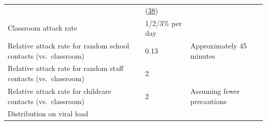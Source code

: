 \documentclass[
]{article}
\begin{document}
\begin{longtable}[]{@{}lll@{}}
\begin{minipage}[t]{0.09\columnwidth}
\end{minipage} & \begin{minipage}[t]{0.54\columnwidth}\raggedright
(\protect\hyperlink{ref-madewell_household_2020}{38})\strut
\end{minipage}\tabularnewline
\begin{minipage}[t]{0.28\columnwidth}\raggedright
Classroom attack rate\strut
\end{minipage} & \begin{minipage}[t]{0.09\columnwidth}\raggedright
1/2/3\% per day\strut
\end{minipage} & \begin{minipage}[t]{0.54\columnwidth}\raggedright
\strut
\end{minipage}\tabularnewline
\begin{minipage}[t]{0.28\columnwidth}\raggedright
Relative attack rate for random school contacts (vs.~classroom)\strut
\end{minipage} & \begin{minipage}[t]{0.09\columnwidth}\raggedright
0.13\strut
\end{minipage} & \begin{minipage}[t]{0.54\columnwidth}\raggedright
Approximately 45 minutes\strut
\end{minipage}\tabularnewline
\begin{minipage}[t]{0.28\columnwidth}\raggedright
Relative attack rate for random staff contacts (vs.~classroom)\strut
\end{minipage} & \begin{minipage}[t]{0.09\columnwidth}\raggedright
2\strut
\end{minipage} & \begin{minipage}[t]{0.54\columnwidth}\raggedright
\strut
\end{minipage}\tabularnewline
\begin{minipage}[t]{0.28\columnwidth}\raggedright
Relative attack rate for childcare contacts (vs.~classroom)\strut
\end{minipage} & \begin{minipage}[t]{0.09\columnwidth}\raggedright
2\strut
\end{minipage} & \begin{minipage}[t]{0.54\columnwidth}\raggedright
Assuming fewer precautions\strut
\end{minipage}\tabularnewline
\begin{minipage}[t]{0.28\columnwidth}\raggedright
Distribution on viral load\strut
\end{minipage} & \begin{minipage}[t]{0.09\columnwidth}\raggedright

\end{minipage}
\end{longtable}
\end{document}
